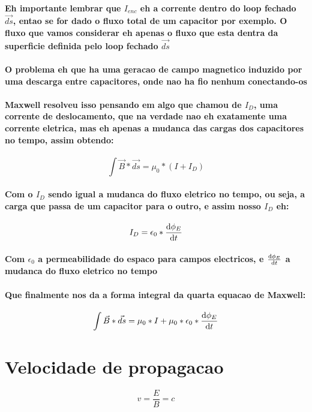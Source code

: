 \documentclass[12pt,twoside, a4paper, twocolumn]{article}
\begin{document}
\paragraph*{Eh importante lembrar que $I_{enc}$ eh a corrente dentro do loop fechado $\vec{ds}$, entao se for dado o fluxo total de um capacitor por exemplo. O fluxo que vamos considerar eh apenas o fluxo que esta dentra da superficie definida pelo loop fechado $\vec{ds}$}
\paragraph*{O problema eh que ha uma geracao de campo magnetico induzido por uma descarga entre capacitores, onde nao ha fio nenhum conectando-os}
\paragraph*{Maxwell resolveu isso pensando em algo que chamou de $I_D$, uma corrente de deslocamento, que na verdade nao eh exatamente uma corrente eletrica, mas eh apenas a mudanca das cargas dos capacitores no tempo, assim obtendo:}
\begin{equation}
    \int \vec{B} * \vec{ds} = \mu_0 * \left(I +I_D\right)
\end{equation}
\paragraph*{Com o $I_D$ sendo igual a mudanca do fluxo eletrico no tempo, ou seja, a carga que passa de um capacitor para o outro, e assim nosso $I_D$ eh:}
\begin{equation}
    I_D = \epsilon_0 * \frac{\mathrm d \phi_E}{\mathrm d t}
\end{equation}
\paragraph*{Com $\epsilon_0$ a permeabilidade do espaco para campos electricos, e $\frac{\mathrm d \phi_E}{\mathrm d t}$ a mudanca do fluxo eletrico no tempo}
\paragraph*{Que finalmente nos da a forma integral da quarta equacao de Maxwell:}
\begin{equation}
    \int \vec{B} * \vec{ds} = \mu_0 * I + \mu_0 * \epsilon_0 * \frac{\mathrm d \phi_E}{\mathrm d t}
\end{equation}


\section{Velocidade de propagacao}
\begin{equation}
    v = \frac{E}{B} = c
\end{equation}
\end{document}
